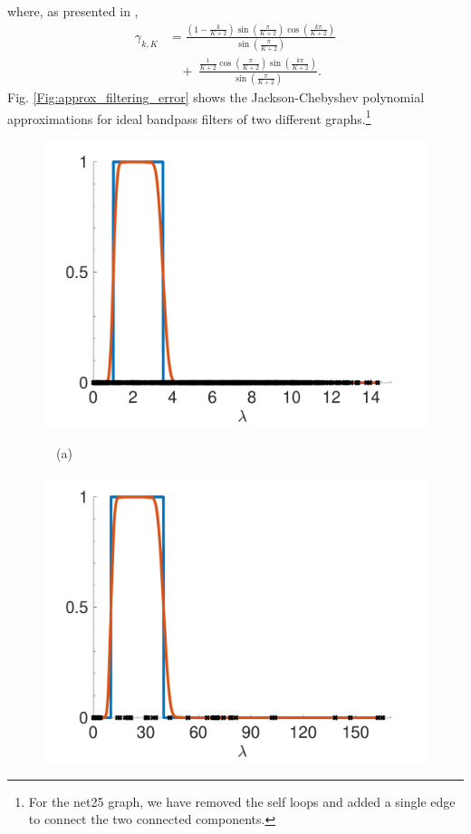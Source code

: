 \documentclass[journal, 10pt]{IEEEtran}
\begin{document}
where, as presented in \cite{di2016efficient}, 
\begin{align}
\gamma_{k,K} &= \frac{\left(1-\frac{k}{K+2}\right)\sin\left(\frac{\pi}{K+2}\right)\cos\left(\frac{k\pi}{K+2}\right)}{\sin\left(\frac{\pi}{K+2}\right)} \nonumber \\
&~~~~+~\frac{\frac{1}{K+2}\cos\left(\frac{\pi}{K+2}\right)\sin\left(\frac{k\pi}{K+2}\right)}{\sin\left(\frac{\pi}{K+2}\right)}. \label{Eq:damping2}
\end{align}
Fig. \ref{Fig:approx_filtering_error} shows the Jackson-Chebyshev polynomial approximations for ideal bandpass filters of two different graphs.\footnote{For the net25 graph, we have removed the self loops and added a single edge to connect the two connected components.}

\begin{figure}[tb]
\begin{minipage}[m]{0.49\linewidth}
\centerline{\includegraphics[width=.9\linewidth]{fig_approx_filter_sensor}}
\centerline{~~\small{(a)}}
\end{minipage}
\begin{minipage}[m]{0.49\linewidth}
\centerline{\includegraphics[width=.9\linewidth]{fig_approx_filter_net25}}

\end{minipage}
\end{figure}
\end{document}
